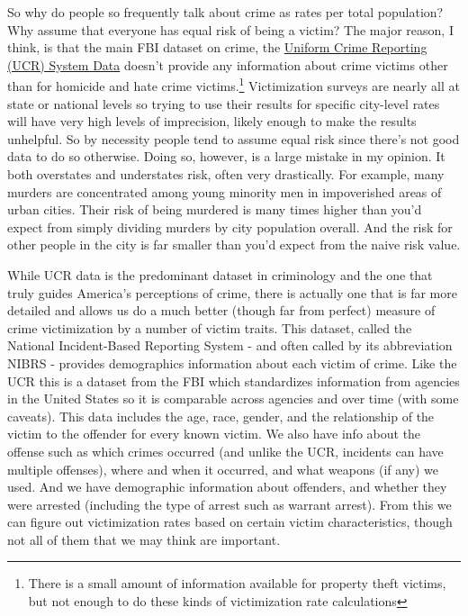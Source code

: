 \documentclass[
  12pt,
  openany]{book}
\begin{document}
So why do people so frequently talk about crime as rates per total population? Why assume that everyone has equal risk of being a victim? The major reason, I think, is that the main FBI dataset on crime, the \href{https://ucrbook.com/}{Uniform Crime Reporting (UCR) System Data} doesn't provide any information about crime victims other than for homicide and hate crime victims.\footnote{There is a small amount of information available for property theft victims, but not enough to do these kinds of victimization rate calculations} Victimization surveys are nearly all at state or national levels so trying to use their results for specific city-level rates will have very high levels of imprecision, likely enough to make the results unhelpful. So by necessity people tend to assume equal risk since there's not good data to do so otherwise. Doing so, however, is a large mistake in my opinion. It both overstates and understates risk, often very drastically. For example, many murders are concentrated among young minority men in impoverished areas of urban cities. Their risk of being murdered is many times higher than you'd expect from simply dividing murders by city population overall. And the risk for other people in the city is far smaller than you'd expect from the naive risk value.

While UCR data is the predominant dataset in criminology and the one that truly guides America's perceptions of crime, there is actually one that is far more detailed and allows us do a much better (though far from perfect) measure of crime victimization by a number of victim traits. This dataset, called the National Incident-Based Reporting System - and often called by its abbreviation NIBRS - provides demographics information about each victim of crime. Like the UCR this is a dataset from the FBI which standardizes information from agencies in the United States so it is comparable across agencies and over time (with some caveats). This data includes the age, race, gender, and the relationship of the victim to the offender for every known victim. We also have info about the offense such as which crimes occurred (and unlike the UCR, incidents can have multiple offenses), where and when it occurred, and what weapons (if any) we used. And we have demographic information about offenders, and whether they were arrested (including the type of arrest such as warrant arrest). From this we can figure out victimization rates based on certain victim characteristics, though not all of them that we may think are important.
\end{document}

